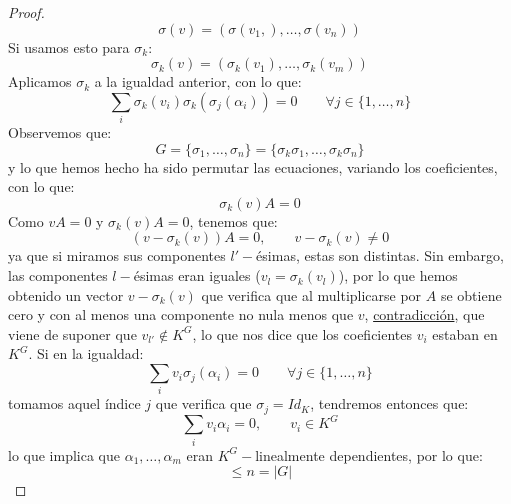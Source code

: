\begin{prop}[Artin]
\begin{proof}
        \begin{equation*}
            \sigma(v) = (\sigma(v_1,), \ldots, \sigma(v_n))
        \end{equation*}
        Si usamos esto para $\sigma_k$:
        \begin{equation*}
            \sigma_k(v) = (\sigma_k(v_1), \ldots, \sigma_k(v_m))
        \end{equation*}
        Aplicamos $\sigma_k$ a la igualdad anterior, con lo que:
        \begin{equation*}
            \sum_i \sigma_k(v_i) \sigma_k(\sigma_j(\alpha_i)) = 0 \qquad \forall j \in \{1,\ldots,n\}
        \end{equation*}
        Observemos que:
        \begin{equation*}
            G = \{\sigma_1, \ldots, \sigma_n\} = \{\sigma_k\sigma_1, \ldots, \sigma_k\sigma_n\}
        \end{equation*}
        y lo que hemos hecho ha sido permutar las ecuaciones, variando los coeficientes, con lo que:
        \begin{equation*}
            \sigma_k(v)A = 0
        \end{equation*}
        Como $vA = 0$ y $\sigma_k(v)A=0$, tenemos que:
        \begin{equation*}
            (v-\sigma_k(v))A = 0, \qquad v-\sigma_k(v) \neq 0
        \end{equation*}
        ya que si miramos sus componentes $l'-$ésimas, estas son distintas. Sin embargo, las componentes $l-$ésimas eran iguales ($v_l = \sigma_k(v_l)$), por lo que hemos obtenido un vector $v-\sigma_k(v)$ que verifica que al multiplicarse por $A$ se obtiene cero y con al menos una componente no nula menos que $v$, \underline{contradicción}, que viene de suponer que $v_{l'}\notin K^G$, lo que nos dice que los coeficientes $v_i$ estaban en $K^G$. Si en la igualdad: 
        \begin{equation*}
            \sum_i v_i \sigma_j(\alpha_i) = 0 \qquad \forall j \in \{1,\ldots,n\}
        \end{equation*}
        tomamos aquel índice $j$ que verifica que $\sigma_j = Id_K$, tendremos entonces que:
        \begin{equation*}
            \sum_{i}v_i \alpha_i = 0, \qquad v_i \in K^G
        \end{equation*}
        lo que implica que $\alpha_1, \ldots, \alpha_m$ eran $K^G-$linealmente dependientes, por lo que:
        \begin{equation*}
            [K:K^G] \leq n = |G|
        \end{equation*}
    \end{proof}
\end{prop}

